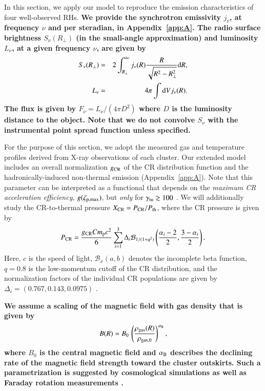 \documentclass[useAMS,usenatbib]{mn2e}
\newcommand{\dd}{\mathrm{d}}
\begin{document}
In this section, we apply our model to reproduce the emission characteristics of
four well-observed RHs.  {\bf We provide the synchrotron emissivity $j_{\nu}$,
  at frequency $\nu$ and per steradian, in Appendix~\ref{app:A}.  The radio
  surface brightness $S_{\nu}(R_{\perp})$ (in the small-angle approximation) and
  luminosity $L_{\nu}$, at a given frequency $\nu$, are given by
\begin{eqnarray}
S_\nu(R_{\perp}) &=& 2 \int_{R_{\perp}}^{\infty} j_{\nu}(R) \frac{R}{\sqrt{R^{2}-R_{\perp}^{2}}} \rmn{d}R, \label{eq:surf} \\
L_{\nu}  &=&  4 \pi \int \dd V j_\nu(R).
\label{eq:lum}
\end{eqnarray}
The flux is given by $F_{\nu}=L_{\nu}/(4\pi D^{2})$ where $D$ is the luminosity
distance to the object. Note that we do not convolve $S_\nu$ with the instrumental
point spread function unless specified.}

For the purpose of this section, we adopt the measured gas and temperature
profiles derived from X-ray observations of each cluster.  Our extended model
includes an overall normalization $g_{{\mathrm{CR}}}$ of the CR distribution function
and the hadronically-induced non-thermal emission (Appendix~\ref{app:A}). Note
that this parameter can be interpreted as a functional that depends on the
\emph{maximum CR acceleration efficiency}, $g(\zeta_{{\mathrm{p,max}}})$, but
\emph{only} for $\gamma_{{\mathrm{tu}}}\gtrsim100$ \citep{2010MNRAS.409..449P}. We
will additionally study the CR-to-thermal pressure $X_{{\mathrm{CR}}}=
P_{{\mathrm{CR}}}/P_{{\mathrm{th}}}$, where the CR pressure is given by
\begin{equation}
  \label{eq:PCR}
  P_{{\mathrm{CR}}}=\frac{g_{{\mathrm{CR}}} C m_{{\mathrm{p}}} c^{2}}{6}
  \sum_{i=1}^{3} \Delta_{i} \mathcal{B}_{1/(1+q^2)} \left(
    \frac{\alpha_{i}-2}{2},\frac{3-\alpha_{i}}{2} \right).
\end{equation}
Here, $c$ is the speed of light, $\mathcal{B}_x(a,b)$ denotes the incomplete beta
function, $q=0.8$ is the low-momentum cutoff of the CR distribution, and the
normalization factors of the individual CR populations are given by $\Delta_{i}
= (0.767, 0.143, 0.0975)$ \citep[][see also
Appendix~\ref{app:A}]{2010MNRAS.409..449P}.

{\bf We assume a scaling of the magnetic field with gas density that is given by
\begin{equation}
B(R) = B_0\,\left(\frac{\rho_{{\mathrm{gas}}}(R)}{\rho_{{\mathrm{gas}},0}}\right)^{ \alpha_{{\mathrm{B}}}},
\label{eq:B}
\end{equation}
where $B_0$ is the central magnetic field and $\alpha_{{\mathrm{B}}}$ describes the
declining rate of the magnetic field strength toward the cluster outskirts. Such
a parametrization is suggested by cosmological simulations \citep{2008A&A...482L..13D} 
as well as Faraday rotation measurements 
\citep[][and references therein]{2010A&A...513A..30B, 2011A&A...529A..13K}.}
\end{document}
